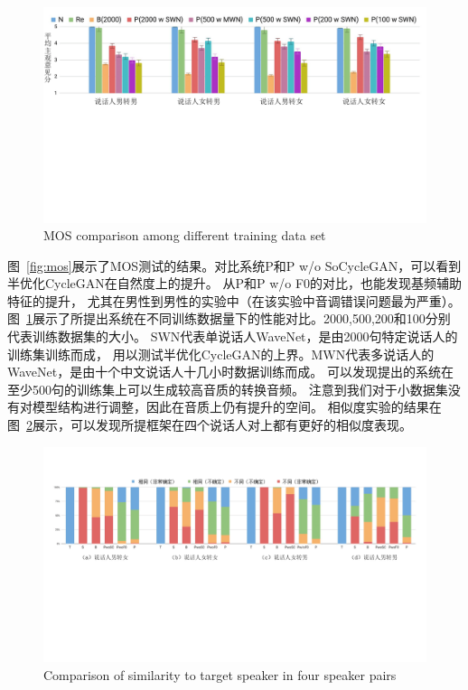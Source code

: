 \begin{figure}[!htp]
    \centering
    \includegraphics[width=13cm,trim=0 290 0 20,clip]{figure/4_mosdata.png}
    {MOS comparison among different training data set}
    \label{fig:mosdata}
\end{figure}


图~\ref{fig:mos}展示了MOS测试的结果。对比系统P和P w/o SoCycleGAN，可以看到半优化CycleGAN在自然度上的提升。
从P和P w/o F0的对比，也能发现基频辅助特征的提升，
尤其在男性到男性的实验中（在该实验中音调错误问题最为严重）。
图~\ref{fig:mosdata}展示了所提出系统在不同训练数据量下的性能对比。2000,500,200和100分别代表训练数据集的大小。
SWN代表单说话人WaveNet，是由2000句特定说话人的训练集训练而成，
用以测试半优化CycleGAN的上界。MWN代表多说话人的WaveNet，是由十个中文说话人十几小时数据训练而成。
可以发现提出的系统在至少500句的训练集上可以生成较高音质的转换音频。
注意到我们对于小数据集没有对模型结构进行调整，因此在音质上仍有提升的空间。
相似度实验的结果在图~\ref{fig:sim}展示，可以发现所提框架在四个说话人对上都有更好的相似度表现。


\begin{figure}[!htp]
    \centering
    \includegraphics[width=13cm,trim=0 250 0 60,clip]{figure/4_sim.png}
    {Comparison of similarity to target speaker in four speaker pairs}
    \label{fig:sim}
\end{figure}

